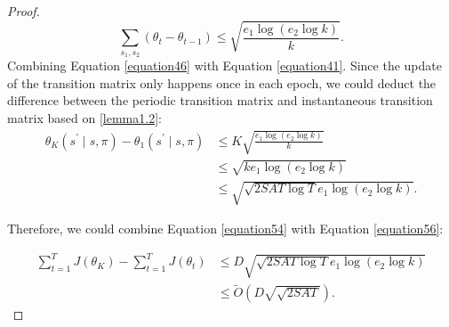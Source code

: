 \begin{theorem}
\begin{proof}
\begin{equation}
\label{equation46}
\sum_{s_{1},s_{2}}(\theta_{t} - \theta_{t-1}) \leq \sqrt{\frac{e_{1} \log \left(e_{2} \log k\right)}{k}}.
\end{equation}
Combining Equation \ref{equation46} with Equation \ref{equation41}. Since the update of the transition matrix only happens once in each epoch, we could deduct the difference between the periodic transition matrix and instantaneous transition matrix based on \ref{lemma1.2}:
\begin{equation}
\label{equation54}
\begin{aligned}
\theta_{K}\left(s^{\prime} \mid s, \pi\right)-\theta_{1}\left(s^{\prime} \mid s, \pi\right) &\leq K\sqrt{\frac{e_{1} \log \left(e_{2} \log k\right)}{k}} \\
&\leq \sqrt{k e_{1} \log \left(e_{2} \log k\right)}\\
&\leq \sqrt{\sqrt{2SAT\log{T}} e_{1} \log \left(e_{2} \log k\right)}.
\end{aligned}
\end{equation}

Therefore, we could combine Equation \ref{equation54} with Equation \ref{equation56}:

\begin{equation}
\begin{aligned}
\sum_{t=1}^{T}J(\theta_{K})-\sum_{t=1}^{T}J\left(\theta_{t}\right) &\leq D\sqrt{\sqrt{2SAT\log{T}} e_{1} \log \left(e_{2} \log k\right)}\\
&\leq \tilde{O}(D\sqrt{\sqrt{2SAT}}).
\end{aligned}
\end{equation}
\end{proof}
\end{theorem}


